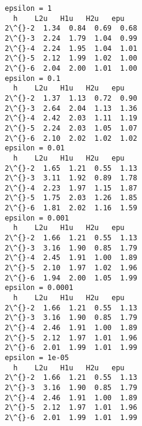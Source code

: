 \documentclass[11pt]{article}
\begin{document}
    \begin{Verbatim}[commandchars=\\\{\}]
epsilon = 1
  h    L2u   H1u   H2u   epu
2\^{}-2  1.34  0.84  0.69  0.68
2\^{}-3  2.24  1.79  1.04  0.99
2\^{}-4  2.24  1.95  1.04  1.01
2\^{}-5  2.12  1.99  1.02  1.00
2\^{}-6  2.04  2.00  1.01  1.00
epsilon = 0.1
  h    L2u   H1u   H2u   epu
2\^{}-2  1.37  1.13  0.72  0.90
2\^{}-3  2.64  2.04  1.13  1.36
2\^{}-4  2.42  2.03  1.11  1.19
2\^{}-5  2.24  2.03  1.05  1.07
2\^{}-6  2.10  2.02  1.02  1.02
epsilon = 0.01
  h    L2u   H1u   H2u   epu
2\^{}-2  1.65  1.21  0.55  1.13
2\^{}-3  3.11  1.92  0.89  1.78
2\^{}-4  2.23  1.97  1.15  1.87
2\^{}-5  1.75  2.03  1.26  1.85
2\^{}-6  1.81  2.02  1.16  1.59
epsilon = 0.001
  h    L2u   H1u   H2u   epu
2\^{}-2  1.66  1.21  0.55  1.13
2\^{}-3  3.16  1.90  0.85  1.79
2\^{}-4  2.45  1.91  1.00  1.89
2\^{}-5  2.10  1.97  1.02  1.96
2\^{}-6  1.94  2.00  1.05  1.99
epsilon = 0.0001
  h    L2u   H1u   H2u   epu
2\^{}-2  1.66  1.21  0.55  1.13
2\^{}-3  3.16  1.90  0.85  1.79
2\^{}-4  2.46  1.91  1.00  1.89
2\^{}-5  2.12  1.97  1.01  1.96
2\^{}-6  2.01  1.99  1.01  1.99
epsilon = 1e-05
  h    L2u   H1u   H2u   epu
2\^{}-2  1.66  1.21  0.55  1.13
2\^{}-3  3.16  1.90  0.85  1.79
2\^{}-4  2.46  1.91  1.00  1.89
2\^{}-5  2.12  1.97  1.01  1.96
2\^{}-6  2.01  1.99  1.01  1.99
    \end{Verbatim}
\end{document}
